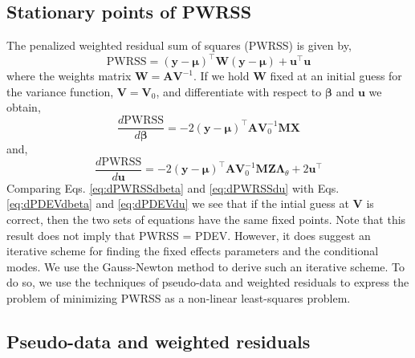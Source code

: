 \documentclass{jss}
\begin{document}
\subsection{Stationary points of PWRSS}

The penalized weighted residual sum of squares (PWRSS) is given by,
\begin{equation}
\mathrm{PWRSS} = (\bm y-\bm\mu)^\top \bm W (\bm y-\bm\mu) + \bm u^\top
\bm u
\label{eq:PWRSS}
\end{equation}
where the weights matrix $\bm W = \bm A \bm V^{-1}$. If we hold $\bm
W$ fixed at an initial
guess for the variance function, $\bm V = \bm V_0$, and differentiate with
respect to $\bm\beta$ and $\bm u$ we obtain,
\begin{equation}
\frac{d \mathrm{PWRSS}}{d \bm\beta} = 
-2 (\bm y - \bm\mu)^\top \bm A
\bm V_0^{-1}
\bm M
\bm X
\label{eq:dPWRSSdbeta}
\end{equation}
and,
\begin{equation}
\frac{d \mathrm{PWRSS}}{d \bm u} = 
-2 (\bm y - \bm\mu)^\top \bm A
\bm V_0^{-1}
\bm M
\bm Z \bm\Lambda_\theta +
2\bm u^\top
\label{eq:dPWRSSdu}
\end{equation}
Comparing Eqs. \ref{eq:dPWRSSdbeta} and \ref{eq:dPWRSSdu} with Eqs. \ref{eq:dPDEVdbeta} and \ref{eq:dPDEVdu} we see that if the intial guess at $\bm
V$ is correct, then the two sets of equations have the same fixed
points. Note that this result does not imply that PWRSS = PDEV. However, it does suggest an iterative scheme for finding the
fixed effects parameters and the conditional modes. We use the Gauss-Newton
method to derive such an iterative scheme. To do so, we use the techniques
of pseudo-data and weighted residuals to express the problem of
minimizing PWRSS as a non-linear least-squares problem.

\subsection{Pseudo-data and weighted residuals}
\end{document}
